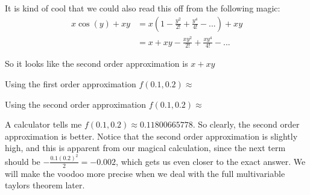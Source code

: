 \documentclass{ximera}
\begin{document}
\begin{question}
		It is kind of cool that we could also read this off from the following magic:
			\begin{align*}
				x\cos(y)+xy &= x(1-\frac{y^2}{2!}+\frac{y^4}{4!}-...)+xy\\	
						&=x+xy-\frac{xy^2}{2!}+\frac{xy^4}{4!}-...
			\end{align*}
		
		So it looks like the second order approximation is $x+xy$
		\begin{solution}
			Using the first order approximation $f(0.1,0.2) \approx$ 
		\end{solution}
		\begin{solution}
			Using the second order approximation $f(0.1,0.2) \approx$ \answer{$0.12$}
		\end{solution}
		
		A calculator tells me $f(0.1,0.2) \approx 0.11800665778$.  So clearly, the second order approximation is better.  Notice that the second order approximation is slightly
		high, and this is apparent from our magical calculation, since the next term should be $-\frac{0.1(0.2)^2}{2}  = -0.002$, which gets us even closer to the exact answer.  We will make the 
		voodoo more precise when we deal with the full multivariable taylors theorem later.
	\end{question}
	
\end{document}
